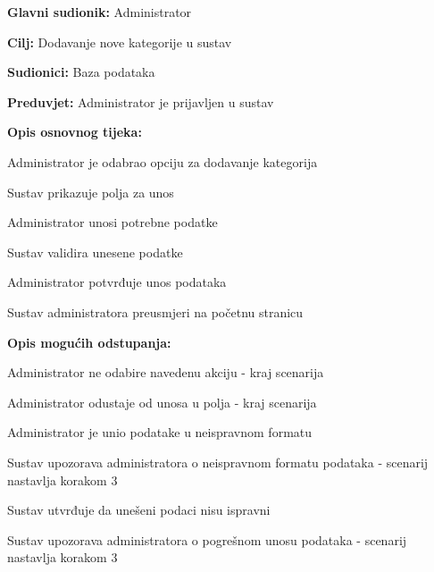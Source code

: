 					\noindent {}
					\begin{packed_item}
	
						\item \textbf{Glavni sudionik: }Administrator
						\item  \textbf{Cilj:} Dodavanje nove kategorije u sustav
						\item  \textbf{Sudionici:} Baza podataka
						\item  \textbf{Preduvjet:} Administrator je prijavljen u sustav
						\item  \textbf{Opis osnovnog tijeka:}
						
						\item[] \begin{packed_enum}
							\item Administrator je odabrao opciju za dodavanje kategorija
							\item Sustav prikazuje polja za unos
							\item Administrator unosi potrebne podatke
							\item Sustav validira unesene podatke
							\item Administrator potvrđuje unos podataka
							\item Sustav administratora preusmjeri na početnu stranicu
						\end{packed_enum}
						\item  \textbf{Opis mogućih odstupanja:}

						\item[] \begin{packed_item}
							\item[1.a] Administrator ne odabire navedenu akciju - kraj scenarija
							\item[3.a] Administrator odustaje od unosa u polja - kraj scenarija
							\item[4.a] Administrator je unio podatake u neispravnom formatu
							\item[] \begin{packed_enum}
								\item Sustav upozorava administratora o neispravnom formatu podataka - scenarij nastavlja korakom 3
							\end{packed_enum}	
							\item[6.a] Sustav utvrđuje da unešeni podaci nisu ispravni
							\item[] \begin{packed_enum}
								\item Sustav upozorava administratora o pogrešnom unosu podataka - scenarij nastavlja korakom 3
							\end{packed_enum}					
						\end{packed_item}
					\end{packed_item}

